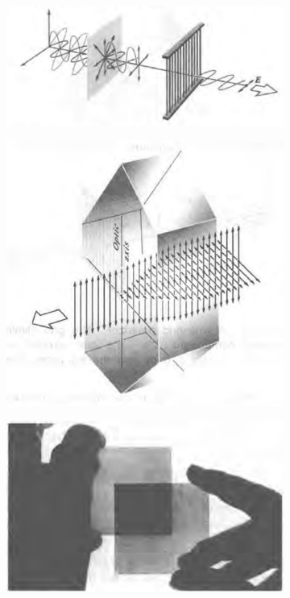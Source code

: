 \begin{figure}[H]
  \centering
  \begin{subfigure}{.3\textwidth}
    \centering
    \includegraphics[width=\linewidth]{figures/WireGrid}
  \end{subfigure}
  \begin{subfigure}{.2\textwidth}
    \centering
    \includegraphics[width=\linewidth]{figures/Dichroic-Crystals}
  \end{subfigure}
  \begin{subfigure}{.3\textwidth}
    \centering
    \includegraphics[width=0.6\linewidth]{figures/Polaroid}
  \end{subfigure}
\end{figure}

